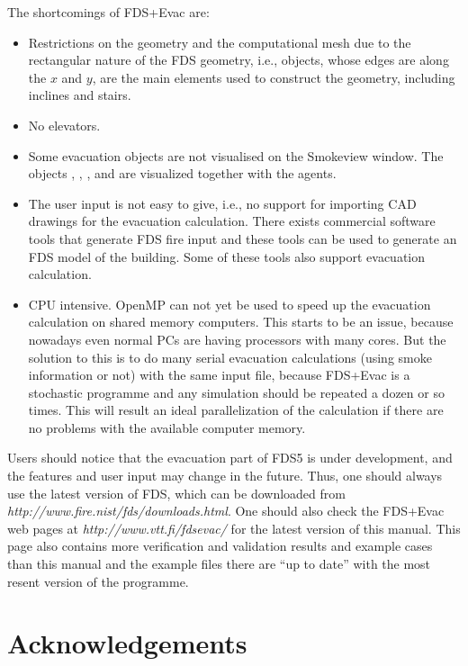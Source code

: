 \documentclass[12pt,a4paper,final,twoside]{stylevk}
\begin{document}
The shortcomings of FDS+Evac are:
%
\begin{itemize}
%
\item Restrictions on the geometry and the computational mesh due to
  the rectangular nature of the FDS geometry, i.e., objects,
  whose edges are along the $x$ and $y$, are the main elements used to
  construct the geometry, including inclines and stairs.
%
\item No elevators.
%
\item Some evacuation objects are not visualised on the Smokeview
  window.  The objects , , , and
   are visualized together with the agents.
%
\item The user input is not easy to give, i.e., no support for
  importing CAD drawings for the evacuation calculation.  There exists
  commercial software tools that generate FDS fire input and these
  tools can be used to generate an FDS model of the building.  Some of
  these tools also support evacuation calculation.
%
\item CPU intensive.  OpenMP can not yet be used to speed up the
  evacuation calculation on shared memory computers.  This starts to
  be an issue, because nowadays even normal PCs are having processors
  with many cores.  But the solution to this is to do many serial
  evacuation calculations (using smoke information or not) with the
  same input file, because FDS+Evac is a stochastic programme and any
  simulation should be repeated a dozen or so times.  This will result
  an ideal parallelization of the calculation if there are no problems
  with the available computer memory.
%
\end{itemize}
%

Users should notice that the evacuation part of FDS5 is under
development, and the features and user input may change in the future.
Thus, one should always use the latest version of FDS, which can be
downloaded from \emph{http://www.fire.nist/fds/downloads.html}.  One
should also check the FDS+Evac web pages at
\emph{http://www.vtt.fi/fdsevac/} for the latest version of this
manual.  This page also contains more verification and validation
results and example cases than this manual and the example files there
are ``up to date'' with the most resent version of the programme.


\clearpage

\newpage

\chapter*{Acknowledgements}
\end{document}
